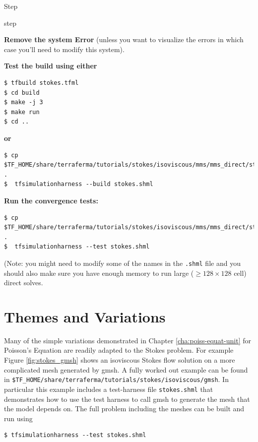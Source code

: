 \begin{steps}{Step}
\begin{steps}{step}
\begin{itemize}
    \end{itemize}


   \end{steps}
 \item \textbf{Remove the system Error} (unless you want to visualize
   the errors in which case you'll need to modify this system).
 \item \textbf{Test the build using either}
   \begin{lstlisting}[style=Bash]
$ tfbuild stokes.tfml
$ cd build
$ make -j 3
$ make run
$ cd ..
   \end{lstlisting}
   \textbf{or}
   \begin{lstlisting}[style=Bash]
$ cp $TF_HOME/share/terraferma/tutorials/stokes/isoviscous/mms/mms_direct/stokes.shml .
$  tfsimulationharness --build stokes.shml
\end{lstlisting} %
 \item \textbf{Run the convergence tests:}
   \begin{lstlisting}[style=Bash]
$ cp $TF_HOME/share/terraferma/tutorials/stokes/isoviscous/mms/mms_direct/stokes.shml .
$  tfsimulationharness --test stokes.shml
\end{lstlisting} %
(Note: you might need to modify some of the names in the
\texttt{.shml} file and you should also make sure you have enough
memory to run large ($\geq 128\times128$ cell) direct solves. 
\end{steps}


\section{Themes and Variations}
\label{sec:themes-variations}

Many of the simple variations demonstrated in Chapter
\ref{cha:poiss-equat-unit} for Poisson's Equation are readily adapted
to the Stokes problem.  For example Figure \ref{fig:stokes_gmsh} shows
an isoviscous Stokes flow solution on a more complicated mesh
generated by gmsh.  A fully worked out example 
can be found in
\texttt{\$TF\_HOME/share/terraferma/tutorials/stokes/isoviscous/gmsh}.
In particular this example includes  a test-harness file
\texttt{stokes.shml} that demonstrates how to use the test harness to
call gmsh to generate the mesh that the model depends on.  The full
problem including the meshes can be built and run using
\begin{lstlisting}[style=Bash]
$ tfsimulationharness --test stokes.shml
\end{lstlisting} %




